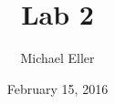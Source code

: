 \documentclass{article} %
\renewcommand{\cftsecfont}{\rmfamily\mdseries\upshape}
\renewcommand{\cftsecpagefont}{\rmfamily\mdseries\upshape} %
\renewcommand{\topfraction}{0.85}
\renewcommand{\textfraction}{0.1}
\renewcommand{\floatpagefraction}{0.85}
\newcommand{\includecode}[2][c]{<!---->}
\begin{document}
\usepackage[nottoc,notlof,notlot]{tocbibind} %
\usepackage[titles,subfigure]{tocloft} %
\renewcommand{\cftsecfont}{\rmfamily\mdseries\upshape}
\renewcommand{\cftsecpagefont}{\rmfamily\mdseries\upshape} %
\renewcommand{\topfraction}{0.85}
\renewcommand{\textfraction}{0.1}
\renewcommand{\floatpagefraction}{0.85}

\usepackage{float}
\usepackage{framed}
\usepackage{amsfonts}
\usepackage{amsmath}
\usepackage{mathabx}
\newcommand{\includecode}[2][c]{<!---->}
\title{Lab 2}
\author{Michael Eller}
\date{February 15, 2016} %
\end{document}
